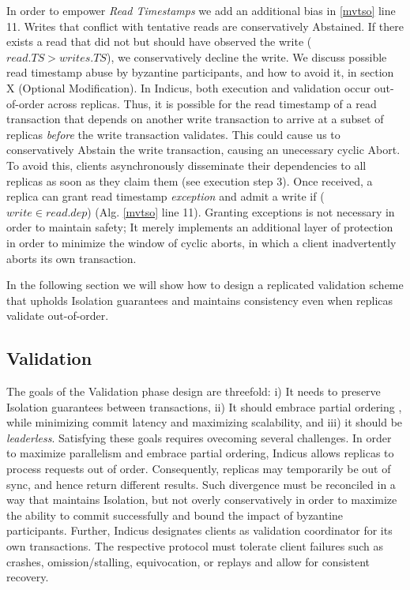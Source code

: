 In order to empower \textit{Read Timestamps} we add an additional bias in \ref{mvtso} line 11. Writes that conflict with tentative reads are conservatively Abstained. If there exists a read that did not but should have observed the write ($read.TS > writes.TS$), we conservatively decline the write. We discuss possible read timestamp abuse by byzantine participants, and how to avoid it, in section X (Optional Modification). In Indicus, both execution and validation occur out-of-order across replicas. Thus, it is possible for the read timestamp of a read transaction that depends on another write transaction to arrive at a subset of replicas \textit{before} the write transaction validates. This could cause us to conservatively Abstain the write transaction, causing an unecessary cyclic Abort. To avoid this, clients asynchronously disseminate their dependencies to all replicas as soon as they claim them (see execution step 3). Once received, a replica can grant read timestamp \textit{exception} and admit a write if ($write \in read.dep$) (Alg. \ref{mvtso} line 11). Granting exceptions is not necessary in order to maintain safety; It merely implements an additional layer of protection in order to minimize the window of cyclic aborts, in which a client inadvertently aborts its own transaction. 

In the following section we will show how to design a replicated validation scheme that upholds Isolation guarantees and maintains consistency even when replicas validate out-of-order.




\subsection{Validation}

The goals of the Validation phase design are threefold: i) It needs to preserve Isolation guarantees between transactions, ii) It should embrace partial ordering , while minimizing commit latency and  maximizing scalability, and iii) it should be \textit{leaderless}. Satisfying these goals requires ovecoming several challenges. In order to maximize parallelism and embrace partial ordering, Indicus allows replicas to process requests out of order. Consequently, replicas may temporarily be out of sync, and hence return different results. Such divergence must be reconciled in a way that maintains Isolation, but not overly conservatively in order to maximize the ability to commit successfully and bound the impact of byzantine participants. Further, Indicus designates clients as validation coordinator for its own transactions. The respective protocol must tolerate client failures such as crashes, omission/stalling, equivocation, or replays and allow for consistent recovery. 

